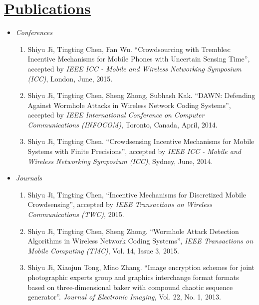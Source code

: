 \documentclass{article}
\newlength{\nL}
\newcommand{\underLineText}[1]{\settowidth{\nL}{#1}\setlength{\nL}{0.95\textwidth-\nL}\underline{{\sc #1}\hspace{\nL}}}
\begin{document}
\section*{\underLineText{Publications}}
\begin{itemize}
\item {\it Conferences}
\begin{enumerate}
\item Shiyu Ji, Tingting Chen, Fan Wu. ``Crowdsourcing with Trembles: Incentive Mechanisms for Mobile Phones with Uncertain Sensing Time'', accepted by {\it IEEE ICC - Mobile and Wireless Networking Symposium (ICC)}, London, June, 2015.

\item Shiyu Ji, Tingting Chen, Sheng Zhong, Subhash Kak. ``DAWN: Defending Against Wormhole Attacks in Wireless Network Coding Systems'', accepted by {\it IEEE International Conference on Computer Communications (INFOCOM)}, Toronto, Canada, April, 2014.

\item Shiyu Ji, Tingting Chen. ``Crowdsensing Incentive Mechanisms for Mobile Systems with Finite Precisions'', accepted by {\it IEEE ICC - Mobile and Wireless Networking Symposium (ICC)}, Sydney, June, 2014.
\end{enumerate}

\item{\it Journals}
\begin{enumerate}
\item Shiyu Ji, Tingting Chen, ``Incentive Mechanisms for Discretized Mobile Crowdsensing'', accepted by {\it IEEE Transactions on Wireless Communications (TWC)}, 2015.

\item Shiyu Ji, Tingting Chen, Sheng Zhong. ``Wormhole Attack Detection Algorithms in Wireless Network Coding Systems'', {\it IEEE Transactions on Mobile Computing (TMC)}, Vol. 14, Issue 3, 2015.

\item Shiyu Ji, Xiaojun Tong, Miao Zhang. ``Image encryption schemes for joint photographic experts group and graphics interchange format formats based on three-dimensional baker with compound chaotic sequence generator''. {\it Journal of Electronic Imaging}, Vol. 22, No. 1, 2013.
\end{enumerate}
\end{itemize}
\end{document}
